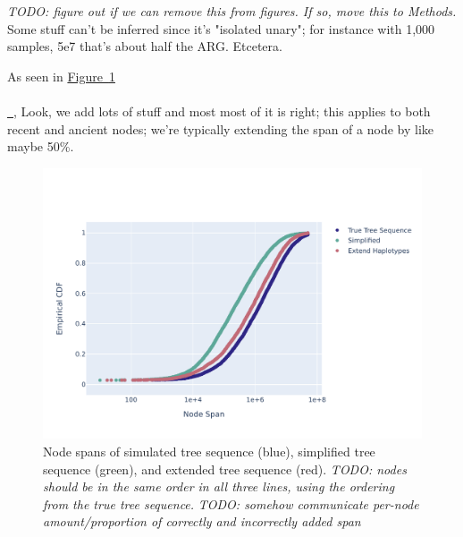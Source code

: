 \documentclass[10pt,twoside,lineno]{gsajnl}
\newcommand{\comment}[1]{{\color{violet} \it #1}}
\newcommand*{\figref}[2][]{%
	\hyperref[{#2}]{%
		Figure~\ref*{#2}%
		\ifx\\#1\\%
		\else
		\,#1%
		\fi
	}%
}
\begin{document}
\comment{TODO: figure out if we can remove this from figures. If so, move this to Methods.}
Some stuff can't be inferred since it's "isolated unary";
for instance with 1,000 samples, 5e7 that's about half the ARG.
Etcetera.

%
%

As seen in \figref{fig:node-spans},
Look, we add lots of stuff
and most most of it is right;
this applies to both recent and ancient nodes;
we're typically extending the span of a node by like maybe 50\%. 

\begin{figure}[bht]
	\includegraphics[width=0.9\linewidth]{newplots_wo_ee/node_spans_wo_trapped_unary_regions_CDF.pdf}
	\caption{
        Node spans of simulated tree sequence (blue), simplified tree sequence (green), and extended tree sequence (red).
        \comment{TODO: nodes should be in the same order in all three lines,
        using the ordering from the true tree sequence.}
        \comment{TODO: somehow communicate per-node amount/proportion of correctly and incorrectly added span}
    }
	\label{fig:node-spans}
\end{figure}
\end{document}
